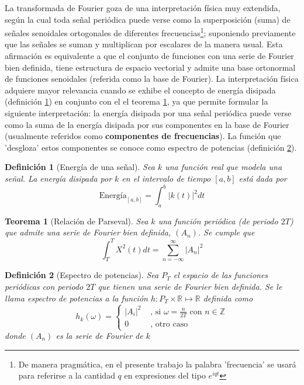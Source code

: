 \documentclass[12pt,a4paper]{mitthesis}
\newtheorem{defn}{Definici\'on}
\newtheorem{thrm}{Teorema}
\newcommand{\abso}[1]{\left| #1 \right|}
\begin{document}
La transformada de Fourier goza de una interpretación física muy extendida, seg\'un la cual toda 
se\~nal peri\'odica puede verse como la superposici\'on (suma) de se\~nales senoidales 
ortogonales de diferentes frecuencias\footnote{De manera pragm\'atica, en el presente trabajo la 
palabra  'frecuencia' se usar\'a para referirse a la cantidad $q$ en expresiones del tipo 
$e^{i q t}$}; suponiendo previamente que las se\~nales se suman y multiplican por escalares de la 
manera usual. 
Esta afirmaci\'on es equivalente a que el conjunto de funciones con una serie de Fourier bien 
definida, tiene estructura de espacio vectorial y admite una base ortonormal de funciones 
senoidales (referida como la base de Fourier). 
La interpretaci\'on f\'isica adquiere mayor relevancia cuando se exhibe el concepto de energ\'ia
disipada (definici\'on \ref{energia}) en conjunto con el el teorema \ref{parseval_serie}, ya que 
permite formular la siguiente interpretaci\'on: la energ\'ia disipada por una se\~nal peri\'odica 
puede verse como la suma de la energ\'ia disipada por sus componentes en la base de Fourier 
(usualmente referidos como \textbf{componentes de frecuencias}).
La funci\'on que 'desgloza' estos componentes se conoce como espectro de potencias (definici\'on 
\ref{espec}).

\begin{defn}[Energ\'ia de una se\~nal]
Sea $k$ una funci\'on real que modela una se\~nal. La energ\'ia disipada por $k$ en el intervalo de
tiempo $[a,b]$ est\'a dada por
\begin{equation*}
\text{Energ\'ia}_{[a,b]} = \int_{a}^{b} \abso{k\left(t\right)}^{2} dt
\end{equation*}
\label{energia}
\end{defn}

\begin{thrm}[Relaci\'on de Parseval]
Sea $k$ una funci\'on peri\'odica (de periodo $2T$) que admite una serie de Fourier bien definida,
$(A_n)$. Se cumple que
\begin{equation*}
\int_T^{T} X^{2}(t) dt = \sum_{n=-\infty}^{\infty} \abso{A_n}^{2}
\end{equation*}
\label{parseval_serie}
\end{thrm}

\newpage

\begin{defn}[Espectro de potencias]
Sea $P_T$ el espacio de las funciones peri\'odicas con periodo $2T$ que tienen una serie de Fourier 
bien definida. Se le llama espectro de potencias a la funci\'on 
$h: P_T \times \mathbb{R} \mapsto \mathbb{R}$ definida como
\begin{equation*}
h_k(\omega) = 
\begin{cases}
\abso{A_i}^{2} & \text{ , si } \omega = \frac{n}{2T} \text{   con } n\in \mathbb{Z} \\
0 & \text{ ,  otro caso}
\end{cases}
\end{equation*}
donde $\left( A_n \right)$ es la serie de Fourier de $k$
\label{espec}
\end{defn}
\end{document}
